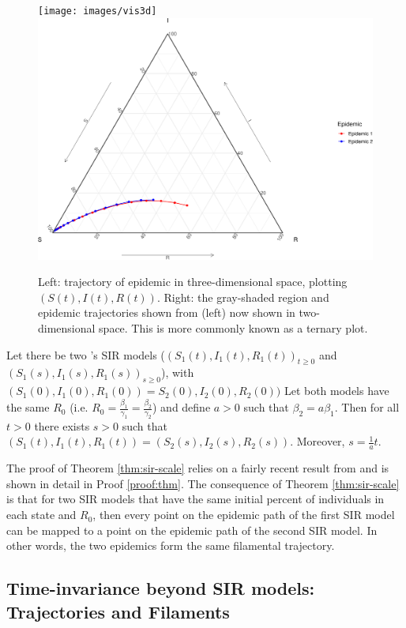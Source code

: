 \documentclass[
  shortnames]{jss}
\begin{document}
\begin{CodeChunk}
\begin{figure}[H]

{\centering \texttt{[image: images/vis3d]} \includegraphics[width=0.49\linewidth]{Figs/unnamed-chunk-3-2} 

}

\caption{\label{fig:different-scales-tern}Left: trajectory of epidemic in three-dimensional space, plotting $(S(t), I(t), R(t))$.  Right: the gray-shaded region and epidemic trajectories shown from (left) now shown in two-dimensional space.  This is more commonly known as a ternary plot.}\label{fig:unnamed-chunk-3}
\end{figure}
\end{CodeChunk}

\begin{theorem}\label{thm:sir-scale}
 Let there be two \citet{Kermack1927}'s SIR models ($(S_1(t),I_1(t),R_1(t))_{t\geq 0}$ and $(S_1(s),I_1(s),R_1(s))_{s\geq 0}$), with $(S_1(0),I_1(0),R_1(0))=S_2(0),I_2(0),R_2(0))$  Let both models have the same $R_0$ (i.e. $R_0 = \frac{\beta_1}{\gamma_1} = \frac{\beta_2}{\gamma_2}$) and define $a > 0$ such that $\beta_2 = a\beta_1$. Then for all $t > 0$ there exists $s>0$ such that $(S_1(t), I_1(t), R_1(t)) = (S_2(s), I_2(s), R_2(s))$.  Moreover, $s = \frac{1}{a}t$.
\end{theorem}

The proof of Theorem \ref{thm:sir-scale} relies on a fairly recent
result from \cite{Harko2014} and is shown in detail in Proof
\ref{proof:thm}. The consequence of Theorem \ref{thm:sir-scale} is that
for two SIR models that have the same initial percent of individuals in
each state and \(R_0\), then every point on the epidemic path of the
first SIR model can be mapped to a point on the epidemic path of the
second SIR model. In other words, the two epidemics form the same
filamental trajectory.

\hypertarget{time-invariance-beyond-sir-models-trajectories-and-filaments}{%
\subsection{Time-invariance beyond SIR models: Trajectories and
Filaments}\label{time-invariance-beyond-sir-models-trajectories-and-filaments}}
\end{document}
